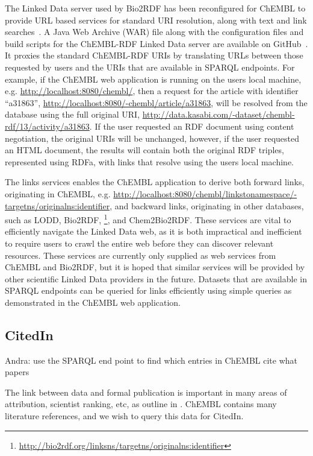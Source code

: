 \documentclass[10pt]{bmc_article}
\newenvironment{bmcformat}{\begin{raggedright}\baselineskip20pt\sloppy\setboolean{publ}{false}}{\end{raggedright}\baselineskip20pt\sloppy}
\begin{document}
\begin{bmcformat}
The Linked Data server used by Bio2RDF has been reconfigured for ChEMBL to provide URL
based services for standard URI resolution, along with text and link searches~\cite{Ansell2011}. 
A Java Web Archive (WAR) file along with the configuration files and build scripts for the ChEMBL-RDF Linked Data server are available on GitHub~\cite{WebAppGitHub}. 
It proxies the standard ChEMBL-RDF URIs by translating URLs between those requested by users and the URIs that are available
in SPARQL endpoints. For example, if the ChEMBL web application is running on the users
local machine, e.g. \url{http://localhost:8080/chembl/}, then a request for the
article with identifier ``a31863'', \url{http://localhost:8080/-chembl/article/a31863},
will be resolved from the database using the full original URI,
\url{http://data.kasabi.com/-dataset/chembl-rdf/13/activity/a31863}. If the
user requested an RDF document using content negotiation, the original URIs will be unchanged,
however, if the user requested an HTML document, the results will contain both the
original RDF triples, represented using RDFa, with links that resolve using the users local machine.

The links services enables the ChEMBL application to derive both forward links, originating in
ChEMBL, e.g. \url{http://localhost:8080/chembl/linkstonamespace/-targetns/originalns:identifier},
and backward links, originating in other databases, such as LODD, Bio2RDF,
\footnote{\url{http://bio2rdf.org/linksns/targetns/originalns:identifier}}, and Chem2Bio2RDF.
These services are vital to efficiently navigate the Linked Data web, as it is both
impractical and inefficient to require users to crawl the entire web before they can discover 
relevant resources. These services are currently only supplied as web services from ChEMBL and
Bio2RDF, but it is hoped that similar services will be provided by other scientific Linked Data
providers in the future. Datasets that are available in SPARQL endpoints can be queried for
links efficiently using simple queries as demonstrated in the ChEMBL web application.

\subsection*{CitedIn}

Andra: use the SPARQL end point to find which entries in ChEMBL cite what papers
 
The link between data and formal publication is important in many areas of
attribution, scientist ranking, etc, as outline in \cite{Waagmeester2012}.
ChEMBL contains many literature references, and we wish to query this data
for CitedIn.


\end{bmcformat}
\end{document}
